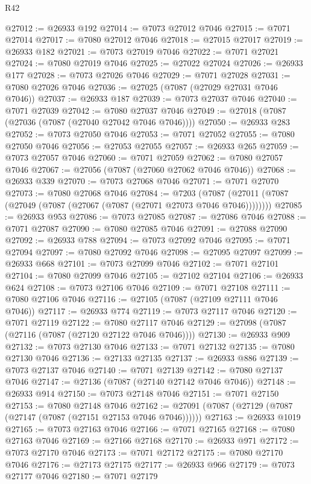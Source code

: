 \begin{lexlean}{R42}
\begin{coremodule}
{@27012 := @26933 @192
@27014 := @7073 @27012 @7046
@27015 := @7071 @27014
@27017 := @7080 @27012 @7046
@27018 := @27015 @27017
@27019 := @26933 @182
@27021 := @7073 @27019 @7046
@27022 := @7071 @27021
@27024 := @7080 @27019 @7046
@27025 := @27022 @27024
@27026 := @26933 @177
@27028 := @7073 @27026 @7046
@27029 := @7071 @27028
@27031 := @7080 @27026 @7046
@27036 := @27025 (@7087 (@27029 @27031 @7046 @7046))
@27037 := @26933 @187
@27039 := @7073 @27037 @7046
@27040 := @7071 @27039
@27042 := @7080 @27037 @7046
@27049 := @27018 (@7087 (@27036 (@7087 (@27040 @27042 @7046 @7046))))
@27050 := @26933 @283
@27052 := @7073 @27050 @7046
@27053 := @7071 @27052
@27055 := @7080 @27050 @7046
@27056 := @27053 @27055
@27057 := @26933 @265
@27059 := @7073 @27057 @7046
@27060 := @7071 @27059
@27062 := @7080 @27057 @7046
@27067 := @27056 (@7087 (@27060 @27062 @7046 @7046))
@27068 := @26933 @339
@27070 := @7073 @27068 @7046
@27071 := @7071 @27070
@27073 := @7080 @27068 @7046
@27084 := @7203
    (@7087 (@27011 (@7087 (@27049 (@7087 (@27067 (@7087 (@27071 @27073 @7046 @7046))))))))
@27085 := @26933 @953
@27086 := @7073 @27085
@27087 := @27086 @7046
@27088 := @7071 @27087
@27090 := @7080 @27085 @7046
@27091 := @27088 @27090
@27092 := @26933 @788
@27094 := @7073 @27092 @7046
@27095 := @7071 @27094
@27097 := @7080 @27092 @7046
@27098 := @27095 @27097
@27099 := @26933 @668
@27101 := @7073 @27099 @7046
@27102 := @7071 @27101
@27104 := @7080 @27099 @7046
@27105 := @27102 @27104
@27106 := @26933 @624
@27108 := @7073 @27106 @7046
@27109 := @7071 @27108
@27111 := @7080 @27106 @7046
@27116 := @27105 (@7087 (@27109 @27111 @7046 @7046))
@27117 := @26933 @774
@27119 := @7073 @27117 @7046
@27120 := @7071 @27119
@27122 := @7080 @27117 @7046
@27129 := @27098 (@7087 (@27116 (@7087 (@27120 @27122 @7046 @7046))))
@27130 := @26933 @909
@27132 := @7073 @27130 @7046
@27133 := @7071 @27132
@27135 := @7080 @27130 @7046
@27136 := @27133 @27135
@27137 := @26933 @886
@27139 := @7073 @27137 @7046
@27140 := @7071 @27139
@27142 := @7080 @27137 @7046
@27147 := @27136 (@7087 (@27140 @27142 @7046 @7046))
@27148 := @26933 @914
@27150 := @7073 @27148 @7046
@27151 := @7071 @27150
@27153 := @7080 @27148 @7046
@27162 := @27091 (@7087 (@27129 (@7087 (@27147 (@7087 (@27151 @27153 @7046 @7046))))))
@27163 := @26933 @1019
@27165 := @7073 @27163 @7046
@27166 := @7071 @27165
@27168 := @7080 @27163 @7046
@27169 := @27166 @27168
@27170 := @26933 @971
@27172 := @7073 @27170 @7046
@27173 := @7071 @27172
@27175 := @7080 @27170 @7046
@27176 := @27173 @27175
@27177 := @26933 @966
@27179 := @7073 @27177 @7046
@27180 := @7071 @27179
}
\end{coremodule}
\end{lexlean}
